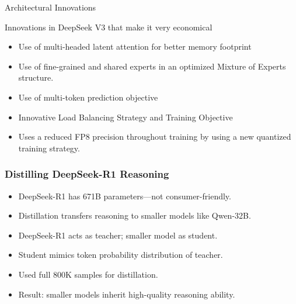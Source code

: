 \begin{frame}[fragile]{ Architectural Innovations}

Innovations in DeepSeek V3 that make it very economical

    \begin{itemize}
        \item   Use of multi-headed latent attention for better memory footprint
        \item   Use of fine-grained and shared experts in an optimized Mixture of Experts 
structure.
        \item   Use of multi-token prediction objective
        \item   Innovative Load Balancing Strategy and Training Objective
        \item   Uses a reduced FP8 precision throughout training by using a new quantized training 
strategy.
    \end{itemize}
\end{frame}


\begin{frame}[fragile]\frametitle{Distilling DeepSeek-R1 Reasoning}

      \begin{itemize}
        \item DeepSeek-R1 has 671B parameters—not consumer-friendly.
        \item Distillation transfers reasoning to smaller models like Qwen-32B.
        \item DeepSeek-R1 acts as teacher; smaller model as student.
        \item Student mimics token probability distribution of teacher.
        \item Used full 800K samples for distillation.
        \item Result: smaller models inherit high-quality reasoning ability.
      \end{itemize}

\end{frame}

